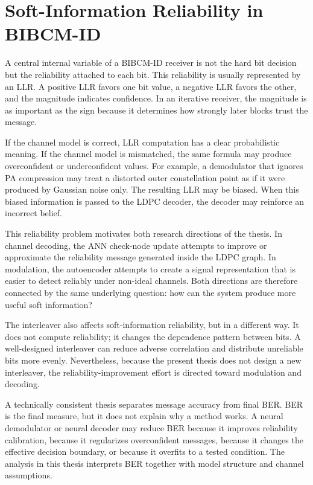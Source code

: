 \section{Soft-Information Reliability in BIBCM-ID}
A central internal variable of a BIBCM-ID receiver is not the hard bit decision but the reliability attached to each bit. This reliability is usually represented by an LLR. A positive LLR favors one bit value, a negative LLR favors the other, and the magnitude indicates confidence. In an iterative receiver, the magnitude is as important as the sign because it determines how strongly later blocks trust the message.

If the channel model is correct, LLR computation has a clear probabilistic meaning. If the channel model is mismatched, the same formula may produce overconfident or underconfident values. For example, a demodulator that ignores PA compression may treat a distorted outer constellation point as if it were produced by Gaussian noise only. The resulting LLR may be biased. When this biased information is passed to the LDPC decoder, the decoder may reinforce an incorrect belief.

This reliability problem motivates both research directions of the thesis. In channel decoding, the ANN check-node update attempts to improve or approximate the reliability message generated inside the LDPC graph. In modulation, the autoencoder attempts to create a signal representation that is easier to detect reliably under non-ideal channels. Both directions are therefore connected by the same underlying question: how can the system produce more useful soft information?

The interleaver also affects soft-information reliability, but in a different way. It does not compute reliability; it changes the dependence pattern between bits. A well-designed interleaver can reduce adverse correlation and distribute unreliable bits more evenly. Nevertheless, because the present thesis does not design a new interleaver, the reliability-improvement effort is directed toward modulation and decoding.

A technically consistent thesis separates message accuracy from final BER. BER is the final measure, but it does not explain why a method works. A neural demodulator or neural decoder may reduce BER because it improves reliability calibration, because it regularizes overconfident messages, because it changes the effective decision boundary, or because it overfits to a tested condition. The analysis in this thesis interprets BER together with model structure and channel assumptions.

